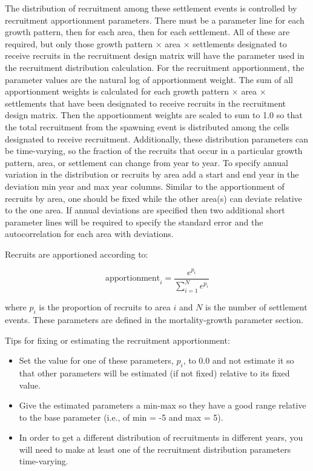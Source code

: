 The distribution of recruitment among these settlement events is controlled by recruitment apportionment parameters. There must be a parameter line for each growth pattern, then for each area, then for each settlement. All of these are required, but only those growth pattern $\times$ area $\times$ settlements designated to receive recruits in the recruitment design matrix will have the parameter used in the recruitment distribution calculation. For the recruitment apportionment, the parameter values are the natural log of apportionment weight. The sum of all apportionment weights is calculated for each growth pattern $\times$ area $\times$ settlements that have been designated to receive recruits in the recruitment design matrix. Then the apportionment weights are scaled to sum to 1.0 so that the total recruitment from the spawning event is distributed among the cells designated to receive recruitment. Additionally, these distribution parameters can be time-varying, so the fraction of the recruits that occur in a particular growth pattern, area, or settlement can change from year to year. To specify annual variation in the distribution or recruits by area add a start and end year in the deviation min year and max year columns. Similar to the apportionment of recruits by area, one should be fixed while the other area(s) can deviate relative to the one area. If annual deviations are specified then two additional short parameter lines will be required to specify the standard error and the autocorrelation for each area with deviations.

\hypertarget{recdist}{}
Recruits are apportioned according to:

\begin{equation}
	\text{apportionment}_i = \frac{e^{p_i}}{\sum_{i=1}^{N}e^{p_i}}
\end{equation}

where $p_i$ is the proportion of recruits to area $i$ and $N$ is the number of settlement events. These parameters are defined in the mortality-growth parameter section.

Tips for fixing or estimating the recruitment apportionment:
\begin{itemize}
	
	\item Set the value for one of these parameters, $p_i$, to 0.0 and not estimate it so that other parameters will be estimated (if not fixed) relative to its fixed value.
	
	\item Give the estimated parameters a min-max so they have a good range relative to the base parameter (i.e., of min = -5 and max = 5).
	
	\item In order to get a different distribution of recruitments in different years, you will need to make at least one of the recruitment distribution parameters time-varying.

\end{itemize}	

